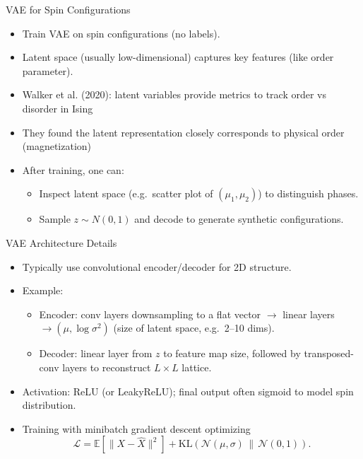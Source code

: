 \documentclass{beamer}
\begin{document}
\begin{frame}{VAE for Spin Configurations}
 \begin{itemize}
   \item Train VAE on spin configurations (no labels).
   \item Latent space (usually low-dimensional) captures key features (like order parameter).
   \item Walker et al. (2020): latent variables provide metrics to track order vs disorder in Ising 
   \item They found the latent representation closely corresponds to physical order (magnetization) 
   \item After training, one can:
     \begin{itemize}
       \item Inspect latent space (e.g.\ scatter plot of $(\mu_1,\mu_2)$) to distinguish phases.
       \item Sample $z\sim N(0,1)$ and decode to generate synthetic configurations.
     \end{itemize}
 \end{itemize}
\end{frame}

\begin{frame}{VAE Architecture Details}
 \begin{itemize}
   \item Typically use convolutional encoder/decoder for 2D structure.
   \item Example:
     \begin{itemize}
       \item Encoder: conv layers downsampling to a flat vector $\rightarrow$ linear layers $\rightarrow (\mu, \log\sigma^2)$ (size of latent space, e.g.\ 2–10 dims).
       \item Decoder: linear layer from $z$ to feature map size, followed by transposed-conv layers to reconstruct $L\times L$ lattice.
     \end{itemize}
   \item Activation: ReLU (or LeakyReLU); final output often sigmoid to model spin distribution.
   \item Training with minibatch gradient descent optimizing
     \[
       \mathcal{L} = \mathbb{E}[\|X - \hat{X}\|^2] +
       \mathrm{KL}(\mathcal{N}(\mu,\sigma)\,\|\,\mathcal{N}(0,1)).
     \]
 \end{itemize}
\end{frame}
\end{document}
